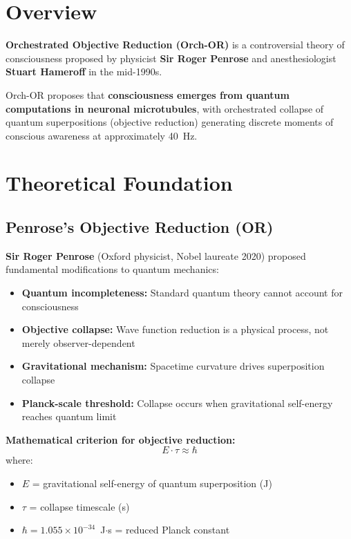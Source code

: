 \section{Overview}

\textbf{Orchestrated Objective Reduction (Orch-OR)} is a controversial theory of consciousness proposed by physicist \textbf{Sir Roger Penrose} and anesthesiologist \textbf{Stuart Hameroff} in the mid-1990s.

\begin{keyconcept}
Orch-OR proposes that \textbf{consciousness emerges from quantum computations in neuronal microtubules}, with orchestrated collapse of quantum superpositions (objective reduction) generating discrete moments of conscious awareness at approximately 40~Hz.
\end{keyconcept}

\section{Theoretical Foundation}

\subsection{Penrose's Objective Reduction (OR)}

\textbf{Sir Roger Penrose} (Oxford physicist, Nobel laureate 2020) proposed fundamental modifications to quantum mechanics:

\begin{itemize}
\item \textbf{Quantum incompleteness:} Standard quantum theory cannot account for consciousness
\item \textbf{Objective collapse:} Wave function reduction is a physical process, not merely observer-dependent
\item \textbf{Gravitational mechanism:} Spacetime curvature drives superposition collapse
\item \textbf{Planck-scale threshold:} Collapse occurs when gravitational self-energy reaches quantum limit
\end{itemize}

\textbf{Mathematical criterion for objective reduction:}
\begin{equation}
\label{eq:or-criterion}
E \cdot \tau \approx \hbar
\end{equation}
where:
\begin{itemize}
\item $E$ = gravitational self-energy of quantum superposition (J)
\item $\tau$ = collapse timescale (s)
\item $\hbar = 1.055 \times 10^{-34}$~J$\cdot$s = reduced Planck constant
\end{itemize}

